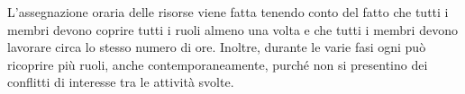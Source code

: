 L'assegnazione oraria delle risorse viene fatta tenendo conto del fatto che tutti i membri devono coprire tutti i ruoli almeno una volta e che tutti i membri devono lavorare circa lo stesso numero di ore. Inoltre, durante le varie fasi ogni  può ricoprire più ruoli, anche contemporaneamente, purché non si presentino dei conflitti di interesse tra le attività svolte. 









\pagebreak
